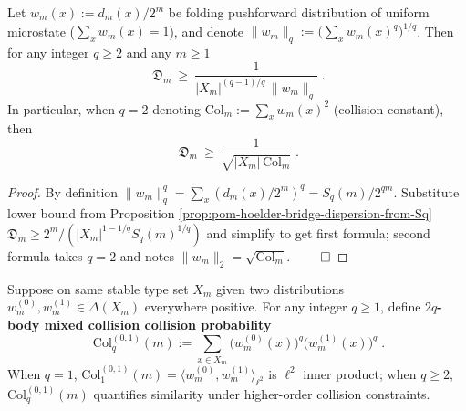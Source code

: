 \begin{corollary}\label{cor:pom-dispersion-lq-lower-bound}
Let \(w_m(x):=d_m(x)/2^m\) be folding pushforward distribution of uniform microstate (\(\sum_x w_m(x)=1\)), and denote
\(
\|w_m\|_q:=\bigl(\sum_x w_m(x)^q\bigr)^{1/q}
\).
Then for any integer \(q\ge 2\) and any \(m\ge 1\)
\[
\boxed{\;
\mathfrak{D}_m\ \ge\ \frac{1}{|X_m|^{(q-1)/q}\,\|w_m\|_q}\; }.
\]
In particular, when \(q=2\) denoting
\(
\mathrm{Col}_m:=\sum_x w_m(x)^2
\)
(collision constant), then
\[
\boxed{\;
\mathfrak{D}_m\ \ge\ \frac{1}{\sqrt{|X_m|\,\mathrm{Col}_m}}\; }.
\]
\end{corollary}
\begin{proof}
By definition \(\|w_m\|_q^q=\sum_x (d_m(x)/2^m)^q=S_q(m)/2^{qm}\).
Substitute lower bound from Proposition \ref{prop:pom-hoelder-bridge-dispersion-from-Sq}
\(
\mathfrak{D}_m \ge 2^m/(|X_m|^{1-1/q}S_q(m)^{1/q})
\)
and simplify to get first formula; second formula takes \(q=2\) and notes \(\|w_m\|_2=\sqrt{\mathrm{Col}_m}\). $\qed$
\end{proof}

\begin{definition}\label{def:pom-mixed-collision-probability}
Suppose on same stable type set \(X_m\) given two distributions \(w_m^{(0)},w_m^{(1)}\in\Delta(X_m)\) everywhere positive.
For any integer \(q\ge 1\), define \textbf{\(2q\)-body mixed collision collision probability}
\[
\boxed{\;
\mathrm{Col}^{(0,1)}_q(m)
:=
\sum_{x\in X_m}\bigl(w_m^{(0)}(x)\bigr)^q\bigl(w_m^{(1)}(x)\bigr)^q\; }.
\]
When \(q=1\), \(\mathrm{Col}^{(0,1)}_1(m)=\langle w_m^{(0)},w_m^{(1)}\rangle_{\ell^2}\) is \(\ell^2\) inner product; when \(q\ge 2\), \(\mathrm{Col}^{(0,1)}_q(m)\) quantifies similarity under higher-order collision constraints.
\end{definition}

